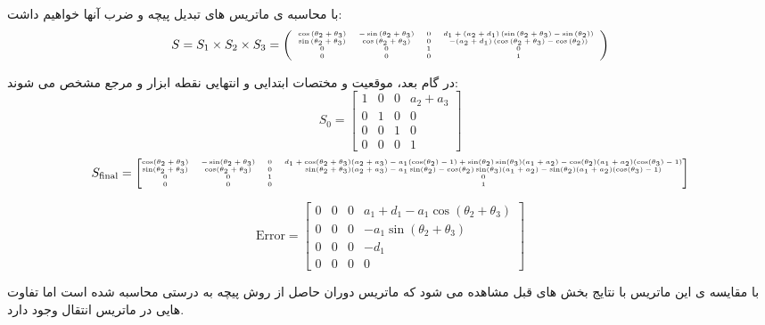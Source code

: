  با محاسبه ی ماتریس های تبدیل پیچه و ضرب آنها خواهیم داشت:
 \[
 \tiny
 S = S_1 \times S_2 \times S_3 = 
 \left(\begin{array}{cccc}
 	\cos \left(\theta_2 +\theta_3 \right) & -\sin \left(\theta_2 +\theta_3 \right) & 0 & d_1 +{\left(a_2 +d_1 \right)}\,{\left(\sin \left(\theta_2 +\theta_3 \right)-\sin \left(\theta_2 \right)\right)}\\
 	\sin \left(\theta_2 +\theta_3 \right) & \cos \left(\theta_2 +\theta_3 \right) & 0 & -{\left(a_2 +d_1 \right)}\,{\left(\cos \left(\theta_2 +\theta_3 \right)-\cos \left(\theta_2 \right)\right)}\\
 	0 & 0 & 1 & 0\\
 	0 & 0 & 0 & 1
 \end{array}\right)
 \]
 
 در گام بعد، موقعیت و مختصات ابتدایی و انتهایی نقطه ابزار و مرجع مشخص می شوند:
 \[
 S_0 = 
 \begin{bmatrix}
 	1 & 0 & 0 & a_2 + a_3 \\
 	0 & 1 & 0 & 0 \\
 	0 & 0 & 1 & 0 \\
 	0 & 0 & 0 & 1
 \end{bmatrix}
 \]
 \[
 \tiny
 S_{\text{final}} = 
 \begin{bmatrix}
 	\cos(\theta_2 + \theta_3) & -\sin(\theta_2 + \theta_3) & 0 & d_1 + \cos(\theta_2 + \theta_3)(a_2 + a_3) - a_1 (\cos(\theta_2) - 1) + \sin(\theta_2) \sin(\theta_3)(a_1 + a_2) - \cos(\theta_2)(a_1 + a_2)(\cos(\theta_3) - 1) \\
 	\sin(\theta_2 + \theta_3) & \cos(\theta_2 + \theta_3) & 0 & \sin(\theta_2 + \theta_3)(a_2 + a_3) - a_1 \sin(\theta_2) - \cos(\theta_2) \sin(\theta_3)(a_1 + a_2) - \sin(\theta_2)(a_1 + a_2)(\cos(\theta_3) - 1) \\
 	0 & 0 & 1 & 0 \\
 	0 & 0 & 0 & 1
 \end{bmatrix}
 \]
 
 \[
 \text{Error} = 
 \begin{bmatrix}
 	0 & 0 & 0 & a_1 + d_1 - a_1 \cos(\theta_2 + \theta_3) \\
 	0 & 0 & 0 & -a_1 \sin(\theta_2 + \theta_3) \\
 	0 & 0 & 0 & -d_1 \\
 	0 & 0 & 0 & 0
 \end{bmatrix}
 \]
 
 با مقایسه ی این ماتریس با نتایج بخش های قبل مشاهده می شود که ماتریس دوران حاصل از روش پیچه به درستی محاسبه شده است اما تفاوت هایی در ماتریس انتقال وجود دارد.

